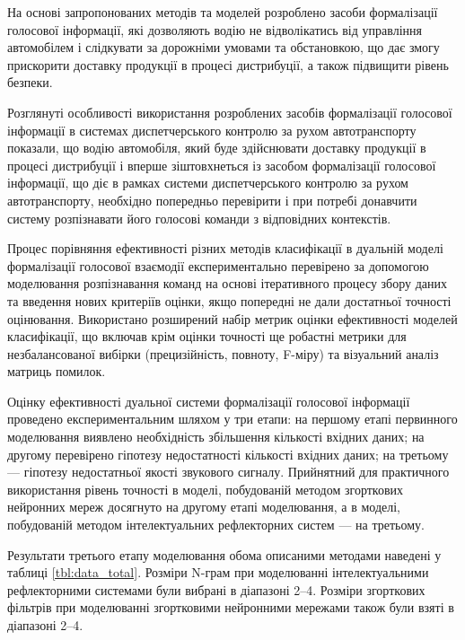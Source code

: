 На основі запропонованих методів та моделей розроблено засоби формалізації голосової інформації, які дозволяють водію не відволікатись від управління автомобілем і слідкувати за дорожніми умовами та обстановкою, що дає змогу прискорити доставку продукції в процесі дистрибуції, а також підвищити рівень безпеки.

Розглянуті особливості використання розроблених засобів формалізації голосової інформації в системах диспетчерського контролю за рухом автотранспорту показали, що водію автомобіля, який буде здійснювати доставку продукції в процесі дистрибуції і вперше зіштовхнеться із засобом формалізації голосової інформації, що діє в рамках системи диспетчерського контролю за рухом автотранспорту, необхідно попередньо перевірити і при потребі донавчити систему розпізнавати його голосові команди з відповідних контекстів.

Процес порівняння ефективності різних методів класифікації в дуальній моделі формалізації голосової взаємодії експериментально перевірено за допомогою моделювання розпізнавання команд на основі ітеративного процесу збору даних та введення нових критеріїв оцінки, якщо попередні не дали достатньої точності оцінювання.
Використано розширений набір метрик оцінки ефективності моделей класифікації, що включав крім оцінки точності ще робастні метрики для незбалансованої вибірки (прецизійність, повноту, F-міру) та візуальний аналіз матриць помилок.

Оцінку ефективності дуальної системи формалізації голосової інформації проведено експериментальним шляхом у три етапи: на першому етапі первинного моделювання виявлено необхідність збільшення кількості вхідних даних; на другому перевірено гіпотезу недостатності кількості вхідних даних; на третьому --- гіпотезу недостатньої якості звукового сигналу. Прийнятний для практичного використання рівень точності в моделі, побудованій методом згорткових нейронних мереж досягнуто на другому етапі моделювання, а в моделі, побудованій методом інтелектуальних рефлекторних систем --- на третьому.

Результати третього етапу моделювання обома описаними методами наведені у таблиці \ref{tbl:data_total}. Розміри N-грам при моделюванні інтелектуальними рефлекторними системами були вибрані в діапазоні 2--4. Розміри згорткових фільтрів при моделюванні згортковими нейронними мережами також були взяті в діапазоні 2--4.

